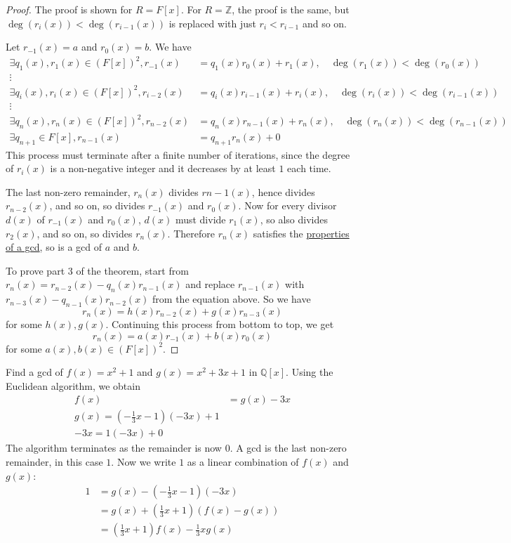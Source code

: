\begin{proof}
	The proof is shown for $R = F[x]$. For $R = \mathbb{Z}$, the proof is the same, but $\deg(r_i(x)) < \deg(r_{i - 1}(x))$ is replaced with just $r_i < r_{i - 1}$ and so on.

	Let $r_{-1} (x) = a$ and $r_0(x) = b$. We have
	\[
		\begin{aligned}
			\exists q_1(x), r_1(x) \in {(F[x])}^2, r_{-1}(x) & = q_1(x) r_0(x) + r_1(x), \quad \deg(r_1(x)) < \deg(r_0(x)) \\
			\vdots \\
			\exists q_i(x), r_i(x) \in {(F[x])}^2, r_{i - 2}(x) & = q_i(x) r_{i - 1}(x) + r_i(x), \quad \deg(r_i(x)) < \deg(r_{i - 1}(x)) \\
			\vdots \\
			\exists q_n(x), r_n(x) \in {(F[x])}^2, r_{n - 2}(x) & = q_n(x) r_{n - 1}(x) + r_n(x), \quad \deg(r_n(x)) < \deg(r_{n - 1}(x)) \\
			\exists q_{n + 1} \in F[x], r_{n - 1}(x) & = q_{n + 1}r_n(x) + 0
		\end{aligned}
	\]
	This process must terminate after a finite number of iterations, since the degree of $r_i(x)$ is a non-negative integer and it decreases by at least $1$ each time.

	The last non-zero remainder, $r_n(x)$ divides $r{n - 1}(x)$, hence divides $r_{n - 2}(x)$, and so on, so divides $r_{-1}(x)$ and $r_0(x)$. Now for every divisor $d(x)$ of $r_{-1}(x)$ and $r_0(x)$, $d(x)$ must divide $r_1(x)$, so also divides $r_2(x)$, and so on, so divides $r_n(x)$. Therefore $r_n(x)$ satisfies the \hyperref[def:gcd]{properties of a gcd}, so is a gcd of $a$ and $b$.

	To prove part 3 of the theorem, start from $r_n(x) = r_{n - 2}(x) - q_n(x) r_{n - 1}(x)$ and replace $r_{n - 1}(x)$ with $r_{n - 3}(x) - q_{n - 1}(x) r_{n - 2}(x)$ from the equation above. So we have
	\[
		r_n(x) = h(x) r_{n - 2}(x) + g(x) r_{n - 3}(x)
	\]
	for some $h(x), g(x)$. Continuing this process from bottom to top, we get
	\[
		r_n(x) = a(x) r_{-1} (x) + b(x) r_0 (x)
	\]
	for some $a(x), b(x) \in {(F[x])}^2$.
\end{proof}

\begin{example}
	Find a gcd of $f(x) = x^2 + 1$ and $g(x) = x^2 + 3x + 1$ in $\mathbb{Q}[x]$. Using the Euclidean algorithm, we obtain
	\[
		\begin{aligned}
			f(x) & = g(x) - 3x \\
			g(x) = (-\frac{1}{3}x - 1)(-3x) + 1 \\
			-3x = 1 (-3x) + 0
		\end{aligned}
	\]
	The algorithm terminates as the remainder is now $0$. A gcd is the last non-zero remainder, in this case $1$. Now we write $1$ as a linear combination of $f(x)$ and $g(x)$:
	\[
		\begin{aligned}
			1
				& = g(x) - \left( -\frac{1}{3}x - 1 \right)(-3x) \\
				& = g(x) + \left( \frac{1}{3}x + 1 \right) (f(x) - g(x)) \\
				& = \left( \frac{1}{3}x + 1 \right) f(x) - \frac{1}{3} x g(x)
		\end{aligned}
	\]
\end{example}

